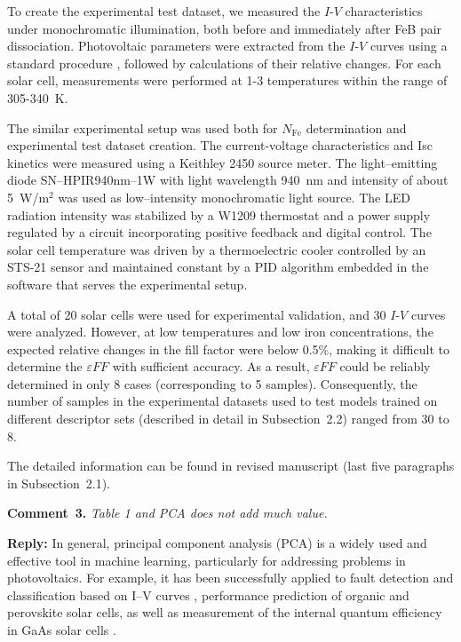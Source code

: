 \documentclass[a4paper,fleqn]{cas-sc}
\begin{document}
To create the experimental test dataset, we measured the $I$-$V$ characteristics under monochromatic illumination,
both before and immediately after FeB pair dissociation.
Photovoltaic parameters were extracted from the $I$-$V$ curves using a standard procedure \cite{SCparam2017},
followed by calculations of their relative changes.
For each solar cell, measurements were performed at 1-3 temperatures within the range of 305-340~K.

The similar experimental setup was used both for $N_\mathrm{Fe}$ determination and experimental test dataset creation.
The current-voltage characteristics and Isc kinetics were measured using a Keithley 2450 source meter.
The light--emitting diode SN--HPIR940nm--1W with light wavelength 940~nm and intensity of about 5~W/m$^{2}$ was used as low--intensity monochromatic light source.
The LED radiation intensity was stabilized by a W1209 thermostat and a power supply regulated by a circuit incorporating positive feedback and digital control.
The solar cell temperature was driven by a thermoelectric cooler controlled by an STS-21 sensor
and maintained constant by a PID algorithm embedded in the software that serves the experimental setup.

A total of 20 solar cells were used for experimental validation, and 30 $I$-$V$ curves were analyzed.
However, at low temperatures and low iron concentrations,
the expected relative changes in the fill factor were below 0.5\%,
making it difficult to determine the $\varepsilon F\!F$ with sufficient accuracy.
As a result, $\varepsilon F\!F$ could be reliably determined in only 8 cases (corresponding to 5 samples).
Consequently, the number of samples in the experimental datasets used to test models trained on different descriptor sets
(described in detail in Subsection~2.2) ranged from 30 to 8.

The detailed information can be found in revised manuscript (last five paragraphs in Subsection~2.1).



\vspace{1cm}
\noindent
\textcolor[rgb]{0.00,0.50,1.00}{\textbf{Comment~3.}}
\emph{Table 1 and PCA does not add much value.}

\noindent
\textcolor[rgb]{0.51,0.00,0.00}{\textbf{Reply:}}
In general, principal component analysis (PCA) is a widely used and effective tool in machine learning,
particularly for addressing problems in photovoltaics.
For example, it has been successfully applied to fault detection and classification based on I–V curves \cite{Fadhel2019, Gao2020},
performance prediction of organic \cite{David2021} and perovskite \cite{Liu2022} solar cells,
as well as measurement of the internal quantum efficiency in GaAs solar cells \cite{AbdullahVetter2025}.
\end{document}
